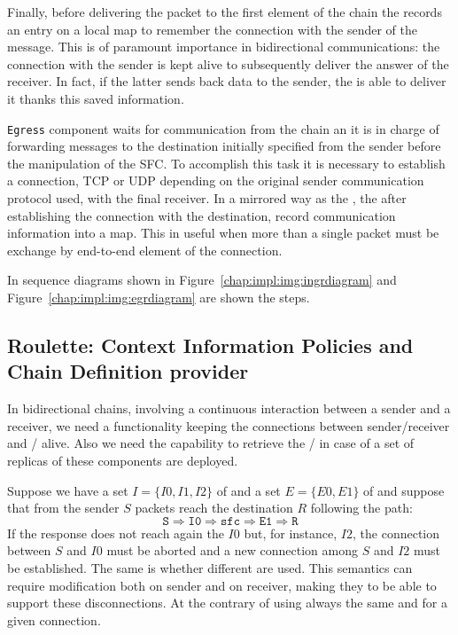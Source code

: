 Finally, before delivering the packet to the first element of the chain the
\ingress{} records an entry on a local map to remember the connection with
the sender of the message. This is of paramount importance in bidirectional
communications: the connection with the sender is kept alive to
subsequently deliver the answer of the receiver. In fact, if the latter sends
back data to the sender, the \ingress{} is able to deliver it thanks this
saved information.

\texttt{Egress} component waits for communication from the chain an it is in
charge of forwarding messages to the destination initially specified from the
sender before the manipulation of the SFC. To accomplish this task it is
necessary to establish a connection, TCP or UDP depending on the original
sender communication protocol used, with the final receiver. In a mirrored way
as the \ingress{}, the \egress{} after establishing the connection with the
destination, record communication information into a map. This in useful when
more than a single packet must be exchange by end-to-end element of the
connection.

In sequence diagrams shown in Figure~\ref{chap:impl:img:ingrdiagram}
and Figure~\ref{chap:impl:img:egrdiagram} are shown the steps.

\subsection{Roulette: Context Information Policies and Chain Definition
provider}
In bidirectional chains, involving a continuous interaction between a
sender and a receiver, we need a functionality keeping the
connections 
between sender/receiver and \ingress{}/\egress{} alive. Also we need the
capability to 
retrieve the \ingress{}/\egress{} in case of a set of replicas of these
components are deployed.
\begin{exmp}
  Suppose we have a set $I=\{I0, I1, I2\}$ of \ingresses{} and a set $E=\{E0,
  E1\}$ of \egresses{} and suppose that from the sender $S$ packets reach the
  destination $R$ following the path:
  \begin{equation*}
    \texttt{S} \Longrightarrow \texttt{I0} \Longrightarrow \texttt{sfc}
    \Longrightarrow \texttt{E1} \Longrightarrow \texttt{R}
  \end{equation*}
  If the response does not reach again the \ingress{} $I0$ but, for instance,
  $I2$, the connection between $S$ and $I0$ must be aborted and a new connection
  among $S$ and $I2$ must be established. The same is whether different
  \egresses{} are used. This semantics can require modification both on sender
  and on receiver, making they to be able to support these disconnections. At
  the contrary of using always the same \ingress{} and \egress{} for a given
  connection.
\end{exmp}


